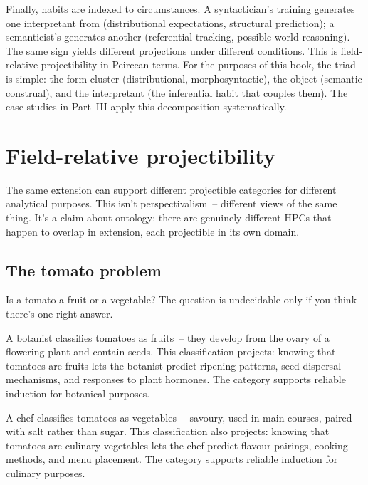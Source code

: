 Finally, habits are indexed to circumstances. A syntactician's training generates one interpretant from  (distributional expectations, structural prediction); a semanticist's generates another (referential tracking, possible-world reasoning). The same sign yields different projections under different conditions. This is field-relative projectibility in Peircean terms. For the purposes of this book, the triad is simple: the form cluster (distributional, morphosyntactic), the object (semantic construal), and the interpretant (the inferential habit that couples them). The case studies in Part~III apply this decomposition systematically.


\section{Field-relative projectibility}
\label{sec:7:field-relative}

The same extension can support different projectible categories for different analytical purposes. This isn't perspectivalism~-- different views of the same thing. It's a claim about ontology: there are genuinely different HPCs that happen to overlap in extension, each projectible in its own domain.

\subsection{The tomato problem}
\label{sec:7:tomato}

Is a tomato a fruit or a vegetable? The question is undecidable only if you think there's one right answer.

A botanist classifies tomatoes as fruits~-- they develop from the ovary of a flowering plant and contain seeds. This classification projects: knowing that tomatoes are fruits lets the botanist predict ripening patterns, seed dispersal mechanisms, and responses to plant hormones. The category  supports reliable induction for botanical purposes.

A chef classifies tomatoes as vegetables~-- savoury, used in main courses, paired with salt rather than sugar. This classification also projects: knowing that tomatoes are culinary vegetables lets the chef predict flavour pairings, cooking methods, and menu placement. The category  supports reliable induction for culinary purposes.

